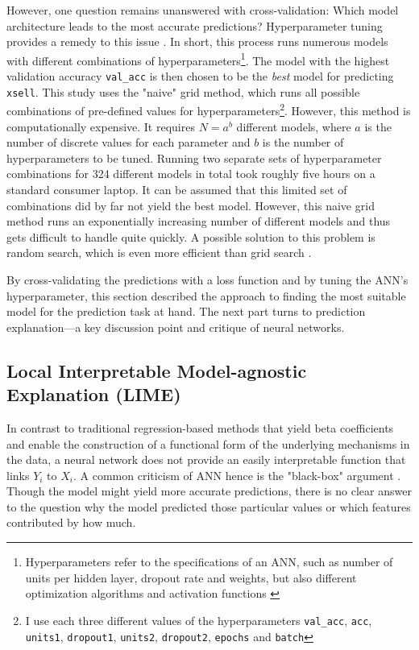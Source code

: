 \documentclass[12pt,a4paper]{article}
\let\code=\texttt
\begin{document}
However, one question remains unanswered with cross-validation: Which model architecture leads to the most accurate predictions?
Hyperparameter tuning provides a remedy to this issue \citep{bergstraRandomSearchHyperparameter2012}.
In short, this process runs numerous models with different combinations of hyperparameters\footnote{Hyperparameters refer to the specifications of an ANN,
such as number of units per hidden layer, dropout rate and weights, but also different optimization algorithms and activation functions \citep{bengioGradientbasedOptimizationHyperparameters2000}}. 
The model with the highest validation accuracy \code{val\_acc} is then chosen to be the \textit{best} model for predicting \code{xsell}.
This study uses the "naive" grid method, which runs all possible combinations of pre-defined values for hyperparameters\footnote{I use each three different values of the hyperparameters \code{val\_acc}, \code{acc}, \code{units1}, \code{dropout1}, \code{units2}, \code{dropout2}, \code{epochs} and \code{batch}}.
However, this method is computationally expensive.
It requires $N=a^b$ different models, where $a$ is the number of discrete values for each parameter and $b$ is the 
number of hyperparameters to be tuned.
Running two separate sets of hyperparameter combinations for 324 different models in total took roughly five hours on a standard consumer laptop.
It can be assumed that this limited set of combinations did by far not yield the best model.
However, this naive grid method runs an exponentially increasing number of different models and thus gets difficult to handle quite quickly.
A possible solution to this problem is random search, which is even more efficient than grid search \citep{bergstraRandomSearchHyperparameter2012}.

By cross-validating the predictions with a loss function and by tuning the ANN's hyperparameter, 
this section described the approach to finding the most suitable model for the prediction task at hand.
The next part turns to prediction explanation---a key discussion point and critique of neural networks.

\subsection{Local Interpretable Model-agnostic Explanation (LIME)} \label{sec_lime_theory}
In contrast to traditional regression-based methods that yield beta coefficients and enable the construction of a functional form of 
the underlying mechanisms in the data, a neural network does not provide an easily interpretable function that links $Y_i$ to $X_i$.
A common criticism of ANN hence is the "black-box" argument \citep{benitezAreArtificialNeural1997, dayhoffArtificialNeuralNetworks2001}.
Though the model might yield more accurate predictions, there is no clear answer to the question why the model predicted those particular values
or which features contributed by how much.
\end{document}

